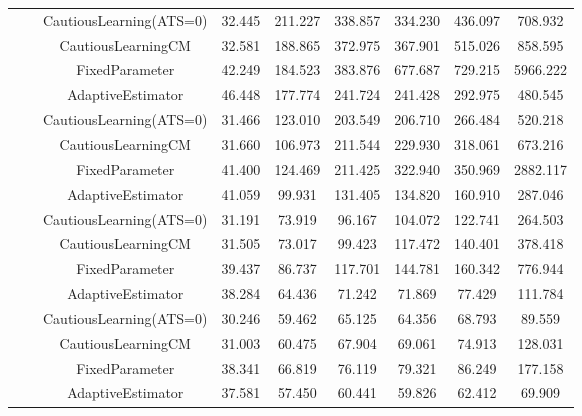 \begin{table}[!h]
\begin{tabular}[t]{ccccccccc}
 &  & CautiousLearning(ATS=0) & 32.445 & 211.227 & 338.857 & 334.230 & 436.097 & 708.932\\

 &  & CautiousLearningCM & 32.581 & 188.865 & 372.975 & 367.901 & 515.026 & 858.595\\

 & \multirow[t]{-4}{*}{\centering\arraybackslash 0.25} & FixedParameter & 42.249 & 184.523 & 383.876 & 677.687 & 729.215 & 5966.222\\
\cmidrule{2-9}
 &  & AdaptiveEstimator & 46.448 & 177.774 & 241.724 & 241.428 & 292.975 & 480.545\\

 &  & CautiousLearning(ATS=0) & 31.466 & 123.010 & 203.549 & 206.710 & 266.484 & 520.218\\

 &  & CautiousLearningCM & 31.660 & 106.973 & 211.544 & 229.930 & 318.061 & 673.216\\

 & \multirow[t]{-4}{*}{\centering\arraybackslash 0.35} & FixedParameter & 41.400 & 124.469 & 211.425 & 322.940 & 350.969 & 2882.117\\
\cmidrule{2-9}
 &  & AdaptiveEstimator & 41.059 & 99.931 & 131.405 & 134.820 & 160.910 & 287.046\\

 &  & CautiousLearning(ATS=0) & 31.191 & 73.919 & 96.167 & 104.072 & 122.741 & 264.503\\

 &  & CautiousLearningCM & 31.505 & 73.017 & 99.423 & 117.472 & 140.401 & 378.418\\

 & \multirow[t]{-4}{*}{\centering\arraybackslash 0.50} & FixedParameter & 39.437 & 86.737 & 117.701 & 144.781 & 160.342 & 776.944\\
\cmidrule{2-9}
 &  & AdaptiveEstimator & 38.284 & 64.436 & 71.242 & 71.869 & 77.429 & 111.784\\

 &  & CautiousLearning(ATS=0) & 30.246 & 59.462 & 65.125 & 64.356 & 68.793 & 89.559\\

 &  & CautiousLearningCM & 31.003 & 60.475 & 67.904 & 69.061 & 74.913 & 128.031\\

 & \multirow[t]{-4}{*}{\centering\arraybackslash 0.75} & FixedParameter & 38.341 & 66.819 & 76.119 & 79.321 & 86.249 & 177.158\\
\cmidrule{2-9}
 &  & AdaptiveEstimator & 37.581 & 57.450 & 60.441 & 59.826 & 62.412 & 69.909\\


\end{tabular}
\end{table}
